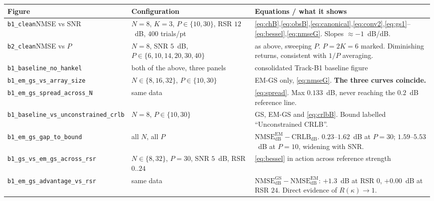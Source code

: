 \documentclass[11pt,a4paper]{article}
\newcommand{\NMSE}{\mathrm{NMSE}}
\newcommand{\dB}{\mathrm{dB}}
\begin{document}
\begin{longtable}{@{}p{}p{}p{}@{}}
\toprule
\textbf{Figure} & \textbf{Configuration} & \textbf{Equations / what it shows}\\
\midrule
\endhead
\texttt{b1\_clean}\newline NMSE vs SNR
& $N=8$, $K=3$, $P\in\{10,30\}$, RSR $12$~dB, $400$ trials/pt
& \eqref{eq:chB},\eqref{eq:obsB},\eqref{eq:canonical},\eqref{eq:conv2},\eqref{eq:gs1}--\eqref{eq:bessel},\eqref{eq:nmseG}. Slopes $\approx-1$~dB/dB.\\
\addlinespace
\texttt{b2\_clean}\newline NMSE vs $P$
& $N=8$, SNR $5$~dB, $P\in\{6,10,14,20,30,40\}$
& as above, sweeping $P$. $P=2K=6$ marked. Diminishing returns, consistent with $1/P$ averaging.\\
\addlinespace
\texttt{b1\_baseline\_}\newline\texttt{no\_hankel}
& both of the above, three panels
& consolidated Track-B1 baseline figure\\
\addlinespace
\texttt{b1\_em\_gs\_vs\_}\newline\texttt{array\_size}
& $N\in\{8,16,32\}$, $P\in\{10,30\}$
& EM-GS only, \eqref{eq:nmseG}. \textbf{The three curves coincide.}\\
\addlinespace
\texttt{b1\_em\_gs\_}\newline\texttt{spread\_across\_N}
& same data
& \eqref{eq:spread}. Max $0.133$~dB, never reaching the $0.2$~dB reference line.\\
\addlinespace
\texttt{b1\_baseline\_vs\_}\newline\texttt{unconstrained\_crlb}
& $N=8$, $P\in\{10,30\}$
& GS, EM-GS and \eqref{eq:crlbB}. Bound labelled ``Unconstrained CRLB''.\\
\addlinespace
\texttt{b1\_em\_gs\_}\newline\texttt{gap\_to\_bound}
& all $N$, all $P$
& $\NMSE^{\mathrm{EM}}_{\dB}-\mathrm{CRLB}_{\dB}$. $0.23$--$1.62$~dB at $P=30$; $1.59$--$5.53$~dB at $P=10$, widening with SNR.\\
\addlinespace
\texttt{b1\_gs\_vs\_em\_gs\_}\newline\texttt{across\_rsr}
& $N\in\{8,32\}$, $P=30$, SNR $5$~dB, RSR $0..24$
& \eqref{eq:bessel} in action across reference strength\\
\addlinespace
\texttt{b1\_em\_gs\_}\newline\texttt{advantage\_vs\_rsr}
& same data
& $\NMSE^{\mathrm{GS}}_{\dB}-\NMSE^{\mathrm{EM}}_{\dB}$: $+1.3$~dB at RSR $0$, $+0.00$~dB at RSR $24$. Direct evidence of $R(\kappa)\to1$.\\
\bottomrule
\end{longtable}
\end{document}
